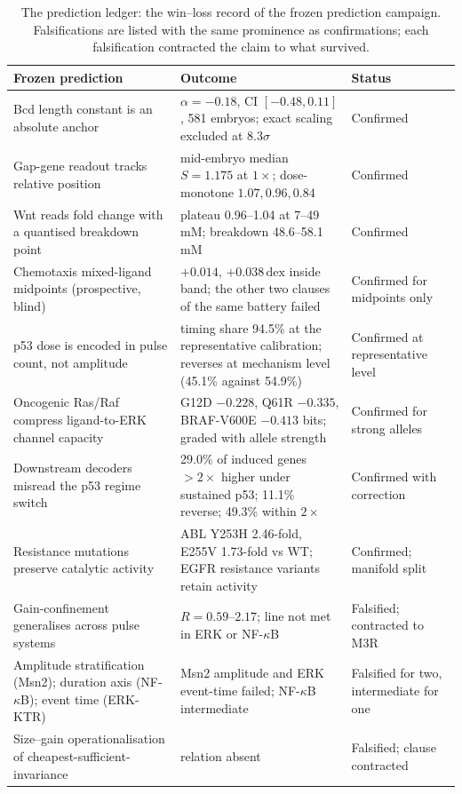 \documentclass[11pt,a4paper]{article}
\newcommand{\dex}{\ensuremath{\,\mathrm{dex}}}
\begin{document}
\begin{table}[!tbp]
\centering
\caption{The prediction ledger: the win--loss record of the frozen prediction campaign. Falsifications are listed with the same prominence as confirmations; each falsification contracted the claim to what survived.}
\label{tab:ledger}
\scriptsize
\begin{tabular}{@{}p{5.4cm}p{4.0cm}p{3.0cm}@{}}
\toprule
\textbf{Frozen prediction} & \textbf{Outcome} & \textbf{Status} \\
\midrule
Bcd length constant is an absolute anchor & $\alpha=-0.18$, CI $[-0.48,0.11]$, 581 embryos; exact scaling excluded at $8.3\sigma$ & Confirmed \\
Gap-gene readout tracks relative position & mid-embryo median $S=1.175$ at $1\times$; dose-monotone $1.07,0.96,0.84$ & Confirmed \\
Wnt reads fold change with a quantised breakdown point & plateau 0.96--1.04 at 7--49 mM; breakdown 48.6--58.1 mM & Confirmed \\
Chemotaxis mixed-ligand midpoints (prospective, blind) & $+0.014$, $+0.038\dex$ inside band; the other two clauses of the same battery failed & Confirmed for midpoints only \\
p53 dose is encoded in pulse count, not amplitude & timing share 94.5\% at the representative calibration; reverses at mechanism level (45.1\% against 54.9\%) & Confirmed at representative level \\
Oncogenic Ras/Raf compress ligand-to-ERK channel capacity & G12D $-0.228$, Q61R $-0.335$, BRAF-V600E $-0.413$ bits; graded with allele strength & Confirmed for strong alleles \\
Downstream decoders misread the p53 regime switch & 29.0\% of induced genes $>2\times$ higher under sustained p53; 11.1\% reverse; 49.3\% within $2\times$ & Confirmed with correction \\
Resistance mutations preserve catalytic activity & ABL Y253H 2.46-fold, E255V 1.73-fold vs WT; EGFR resistance variants retain activity & Confirmed; manifold split \\
Gain-confinement generalises across pulse systems & $R=0.59$--$2.17$; line not met in ERK or NF-$\kappa$B & Falsified; contracted to M3R \\
Amplitude stratification (Msn2); duration axis (NF-$\kappa$B); event time (ERK-KTR) & Msn2 amplitude and ERK event-time failed; NF-$\kappa$B intermediate & Falsified for two, intermediate for one \\
Size--gain operationalisation of cheapest-sufficient-invariance & relation absent & Falsified; clause contracted \\

\end{tabular}
\end{table}
\end{document}
